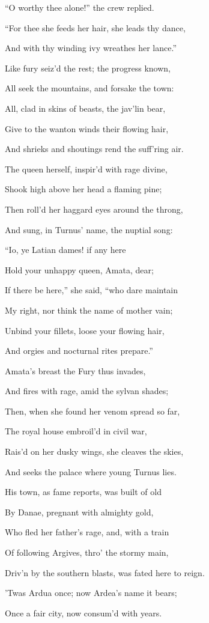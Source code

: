 “O worthy thee alone!” the crew replied.

“For thee she feeds her hair, she leads thy dance,

And with thy winding ivy wreathes her lance.”

Like fury seiz’d the rest; the progress known,

All seek the mountains, and forsake the town:

All, clad in skins of beasts, the jav’lin bear,

Give to the wanton winds their flowing hair,

And shrieks and shoutings rend the suff’ring air.

The queen herself, inspir’d with rage divine,

Shook high above her head a flaming pine;

Then roll’d her haggard eyes around the throng,

And sung, in Turnus’ name, the nuptial song:

“Io, ye Latian dames! if any here

Hold your unhappy queen, Amata, dear;

If there be here,” she said, “who dare maintain

My right, nor think the name of mother vain;

Unbind your fillets, loose your flowing hair,

And orgies and nocturnal rites prepare.”

Amata’s breast the Fury thus invades,

And fires with rage, amid the sylvan shades;

Then, when she found her venom spread so far,

The royal house embroil’d in civil war,

Rais’d on her dusky wings, she cleaves the skies,

And seeks the palace where young Turnus lies.

His town, as fame reports, was built of old

By Danae, pregnant with almighty gold,

Who fled her father’s rage, and, with a train

Of following Argives, thro’ the stormy main,

Driv’n by the southern blasts, was fated here to reign.

’Twas Ardua once; now Ardea’s name it bears;

Once a fair city, now consum’d with years.

